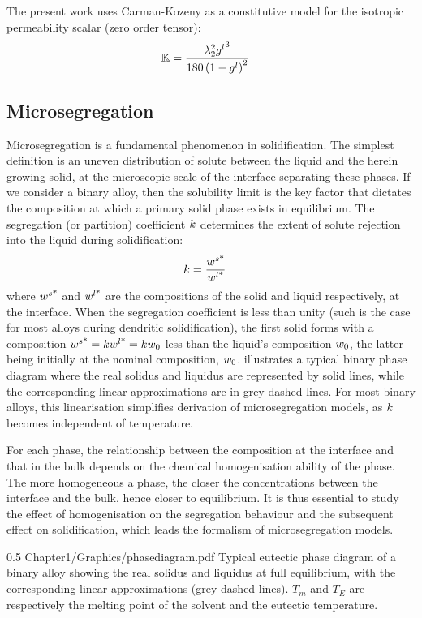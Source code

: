 The present work uses Carman-Kozeny as a constitutive model for the isotropic permeability scalar (zero order tensor):
\begin{align}
\label{eq:permeability}
& \mathbb{K}  = \frac{{\lambda}_{2}^2 {g^l}^3}{180\left( 1-{g^l} \right)^2}
\end{align}
%
\subsection{Microsegregation}
Microsegregation is a fundamental phenomenon in solidification. The simplest definition is 
an uneven distribution of solute between the liquid and the herein growing solid, at the microscopic scale
of the interface separating these phases. If we consider a binary alloy, then the solubility limit is 
the key factor that dictates the composition at which a primary solid phase exists in equilibrium. 
The segregation (or partition) coefficient $k$ determines the extent of solute rejection into the liquid during solidification:
\begin{align}
\label{eq:partition}
& k = \frac{{w}^{s \text{*}} }{{w}^{l \text{*}} }
\end{align}
where ${w}^{s \text{*}} $ and ${w}^{l \text{*}} $ are the compositions of the solid and liquid respectively, at the interface. When the 
segregation coefficient is less than unity (such is the case for most alloys during dendritic solidification), 
the first solid forms with a composition ${w}^{s \text{*}} =k {w}^{l \text{*}} =k {w}_0$ less than the liquid's 
composition ${w}_0$, the latter being initially at the nominal composition, ${w}_0$.  illustrates a typical binary 
phase diagram where the real solidus and liquidus are represented by solid lines, while the corresponding linear approximations are in grey dashed lines.
For most binary alloys, this linearisation simplifies derivation of microsegregation models, as $k$ becomes independent of temperature.

For each phase, the relationship between the composition at the interface and that in the bulk depends on the chemical homogenisation ability of the phase.
The more homogeneous a phase, the closer the concentrations between the interface and the bulk, hence closer to equilibrium.
It is thus essential to study the effect of homogenisation on the segregation behaviour and the subsequent effect on solidification, which leads the formalism of microsegregation models.
\begin{figureth}
{0.5}
{Chapter1/Graphics/phasediagram.pdf}
{Typical eutectic phase diagram of a binary alloy showing the real solidus and liquidus at full equilibrium,
with the corresponding linear approximations (grey dashed lines). $T_m$ and $T_E$ are respectively the melting point
of the solvent and the eutectic temperature.}
\label{fig:binary_diag}
\end{figureth}
%
